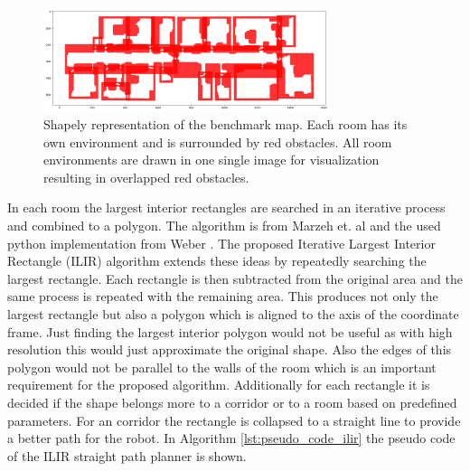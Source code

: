 \begin{figure}[h]
    \centering
    \includegraphics[width=0.75\textwidth]{figures/50_implementation/ruy_shapely.png}
    \caption[Shapely representation of the benchmark map]{Shapely representation of the benchmark map. Each room has its own environment and is surrounded by red obstacles. All room environments are drawn in one single image for visualization resulting in overlapped red obstacles.}
    \label{fig:ryu_shapely}
\end{figure}

In each room the largest interior rectangles are searched in an iterative process and combined to a polygon. The algorithm is from Marzeh et. al \cite{marzeh_algorithm_2019} and the used python implementation from Weber \cite{weber_largest_2023}. The proposed Iterative Largest Interior Rectangle (ILIR) algorithm extends these ideas by repeatedly searching the largest rectangle. Each rectangle is then subtracted from the original area and the same process is repeated with the remaining area. This produces not only the largest rectangle but also a polygon which is aligned to the axis of the coordinate frame. Just finding the largest interior polygon would not be useful as with high resolution this would just approximate the original shape. Also the edges of this polygon would not be parallel to the walls of the room which is an important requirement for the proposed algorithm. Additionally for each rectangle it is decided if the shape belongs more to a corridor or to a room based on predefined parameters. For an corridor the rectangle is collapsed to a straight line to provide a better path for the robot. In Algorithm \ref{lst:pseudo_code_ilir} the pseudo code of the ILIR straight path planner is shown.

